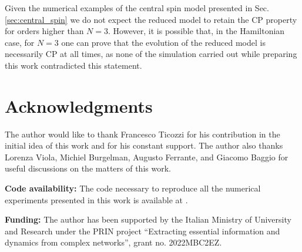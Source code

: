 \documentclass[twocolumn]{autart}    %
\begin{document}
Given the numerical examples of the central spin model presented in Sec. \ref{sec:central_spin} we do not expect the reduced model to retain the CP property for orders higher than $N=3$. However, it is possible that, in the Hamiltonian case, for $N=3$ one can prove that the evolution of the reduced model is necessarily CP at all times, as none of the simulation carried out while preparing this work contradicted this statement. 


\section{Acknowledgments}
The author would like to thank Francesco Ticozzi for his contribution in the initial idea of this work and for his constant support. The author also thanks Lorenza Viola, Michiel Burgelman, Augusto Ferrante, and Giacomo Baggio for useful discussions on the matters of this work.

\textbf{Code availability:} The code necessary to reproduce all the numerical experiments presented in this work is available at \cite{Myrepo}. 

\textbf{Funding:}
The author has been supported by the Italian Ministry of University and Research under the PRIN project “Extracting essential information and dynamics from complex networks”, grant no. 2022MBC2EZ.




\appendix
\end{document}
